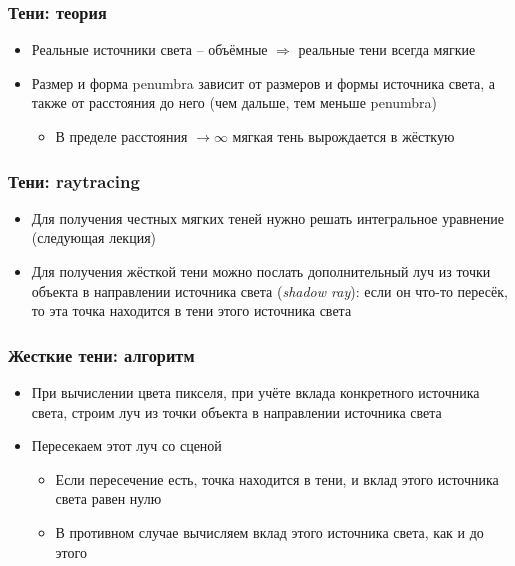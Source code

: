 \documentclass[10pt]{beamer}
\begin{document}
\begin{frame}[fragile]
\frametitle{Тени: теория}
\begin{itemize}
\item Реальные источники света -- объёмные \begin{math}\Longrightarrow\end{math} реальные тени всегда мягкие
\pause
\item Размер и форма penumbra зависит от размеров и формы источника света, а также от расстояния до него (чем дальше, тем меньше penumbra)
\pause
\begin{itemize}
\item В пределе расстояния \begin{math}\rightarrow\infty\end{math} мягкая тень вырождается в жёсткую
\end{itemize}
\end{itemize}
\end{frame}

\begin{frame}[fragile]
\frametitle{Тени: raytracing}
\begin{itemize}
\item Для получения честных мягких теней нужно решать интегральное уравнение (следующая лекция)
\pause
\item Для получения жёсткой тени можно послать дополнительный луч из точки объекта в направлении источника света (\textit{shadow ray}): если он что-то пересёк, то эта точка находится в тени этого источника света
\end{itemize}
\end{frame}

\begin{frame}[fragile]
\frametitle{Жесткие тени: алгоритм}
\begin{itemize}
\item При вычислении цвета пикселя, при учёте вклада конкретного источника света, строим луч из точки объекта в направлении источника света
\pause
\item Пересекаем этот луч со сценой
\pause
\begin{itemize}
\item Если пересечение есть, точка находится в тени, и вклад этого источника света равен нулю
\pause
\item В противном случае вычисляем вклад этого источника света, как и до этого
\end{itemize}
\end{itemize}
\end{frame}
\end{document}
